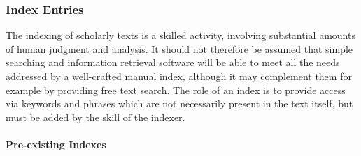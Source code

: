 \subsubsection[{Index Entries}]{Index Entries}\label{CONOIX}\par
The indexing of scholarly texts is a skilled activity, involving substantial amounts of human judgment and analysis. It should not therefore be assumed that simple searching and information retrieval software will be able to meet all the needs addressed by a well-crafted manual index, although it may complement them for example by providing free text search. The role of an index is to provide access via keywords and phrases which are not necessarily present in the text itself, but must be added by the skill of the indexer. 
\paragraph[{Pre-existing Indexes}]{Pre-existing Indexes}\label{CONOIXpre}\par
